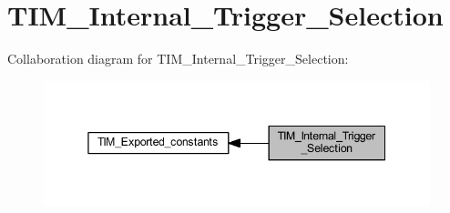 \hypertarget{group___t_i_m___internal___trigger___selection}{}\section{T\+I\+M\+\_\+\+Internal\+\_\+\+Trigger\+\_\+\+Selection}
\label{group___t_i_m___internal___trigger___selection}
Collaboration diagram for T\+I\+M\+\_\+\+Internal\+\_\+\+Trigger\+\_\+\+Selection\+:\nopagebreak
\begin{figure}[H]
\begin{center}
\leavevmode
\includegraphics[width=345pt]{group___t_i_m___internal___trigger___selection}
\end{center}
\end{figure}
